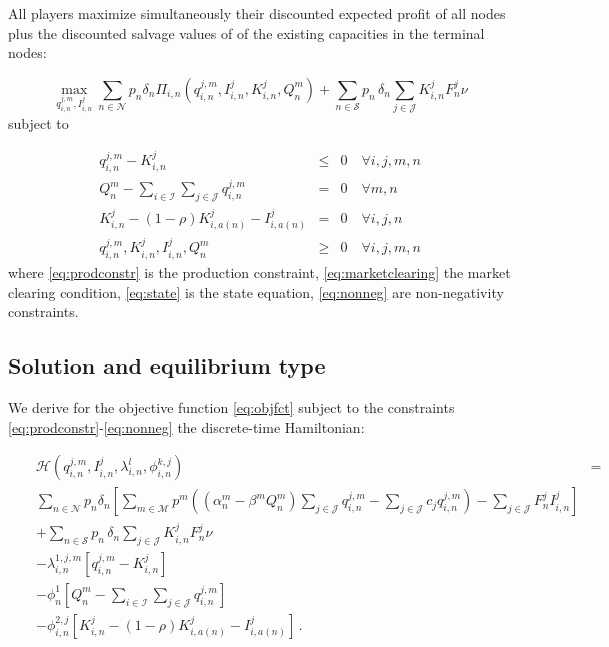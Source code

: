 All players maximize simultaneously their discounted expected profit of all nodes plus the discounted salvage values of of the existing capacities in the terminal nodes:

\begin{equation}
  \label{eq:objfct}
  \max_{q_{i,n}^{j,m}, I_{i,n}^{j}} \sum_{n\in \mathcal{N}}p_n\delta_n\Pi_{i,n}\left(q_{i,n}^{j,m}, I_{i,n}^{j}, K_{i,n}^{j}, Q_n^m\right)+ \sum_{n\in \mathcal{S}}p_n\,\delta_n \sum_{j\in \mathcal{J}}K_{i,n}^{j}F_n^{j}\nu
\end{equation}
subject to
  
\begin{eqnarray}  
q_{i,n}^{j,m} - K_{i,n}^{j} &\leq& 0 \quad \forall i,j,m,n \label{eq:prodconstr} \\
Q_n^m-\sum_{i\in \mathcal{I}}\sum_{j\in \mathcal{J}} q_{i,n}^{j,m} &=& 0 \quad \forall m,n \label{eq:marketclearing}\\
K_{i,n}^{j} - (1-\rho)K_{i,a(n)}^{j}-I_{i,a(n)}^{j} &=& 0 \quad \forall i,j,n \label{eq:state} \\
q_{i,n}^{j,m}, K_{i,n}^{j}, I_{i,n}^{j}, Q_n^m  &\geq& 0 \quad \forall i,j,m,n\label{eq:nonneg}
\end{eqnarray}
where \eqref{eq:prodconstr} is the production constraint, \eqref{eq:marketclearing} the market clearing condition, \eqref{eq:state} is the state equation, \eqref{eq:nonneg} are non-negativity constraints.

\subsection{Solution and equilibrium type}
\label{sec:solution}

We derive for the objective function \eqref{eq:objfct} subject to the constraints \eqref{eq:prodconstr}-\eqref{eq:nonneg} the discrete-time Hamiltonian:

\begin{align}
  \label{eq:kkt1}
  && \mathcal{H}(q_{i,n}^{j,m}, I_{i,n}^{j},\lambda_{i,n}^{l},\phi_{i,n}^{k,j}) &=& \\
  && \sum_{n\in \mathcal{N}}p_n\delta_n\left[ \sum_{m\in\mathcal{M}}p^m\left( \left(\alpha_n^m-\beta^m Q_n^m \right)\sum_{j\in \mathcal{J}}q_{i,n}^{j,m}-\sum_{j\in \mathcal{J}}c_jq_{i,n}^{j,m}\right)-\sum_{j\in \mathcal{J}}F_n^{j}I_{i,n}^{j}\right]\nonumber\\
&&+ \sum_{n\in \mathcal{S}}p_n\,\delta_n \sum_{j\in \mathcal{J}}K_{i,n}^{j}F_n^{j}\nu\nonumber\\
 && - \lambda_{i,n}^{1,j,m}\left[q_{i,n}^{j,m} - K_{i,n}^{j}\right]\nonumber\\
 &&  - \phi_{n}^{1}\left[Q_n^m-\sum_{i\in \mathcal{I}}\sum_{j\in \mathcal{J}} q_{i,n}^{j,m}\right]\nonumber\\
 &&  - \phi_{i,n}^{2,j}\left[K_{i,n}^{j} - (1-\rho)K_{i,a(n)}^{j}-I_{i,a(n)}^{j}\right]\,.\nonumber
\end{align}

